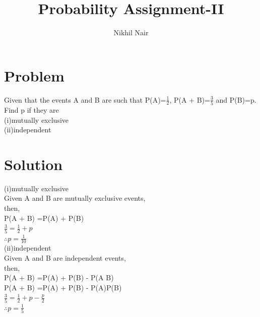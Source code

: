 \documentclass[journal,12pt,twocolumn]{IEEEtran}
\title{\mytitle}
\title{
Probability Assignment-II
}
\author{Nikhil Nair}
\begin{document}
\maketitle
\bigskip



\section{\textbf{Problem }}
Given that the events A and B are such that P(A)=$\frac{1}{2}$, P(A + B)=$\frac{3}{5}$ and P(B)=p. Find p if they are \\
(i)mutually exclusive\\
(ii)independent


\section{\textbf{Solution }}

(i)mutually exclusive
\\
Given A and B are mutually exclusive events,\\
then,
\\

P(A + B) =P(A) + P(B)\\

$\frac{3}{5}=\frac{1}{2}+p$\\

$\therefore  p = \frac{1}{10}$\\

(ii)independent
\\
Given A and B are independent events,\\
then,
\\

P(A + B) =P(A) + P(B) - P(A B)\\


P(A + B) =P(A) + P(B) - P(A)P(B)\\

$\frac{3}{5}=\frac{1}{2}+ p - \frac{p}{2}$\\

$\therefore p = \frac{1}{5}$\\
\end{document}
